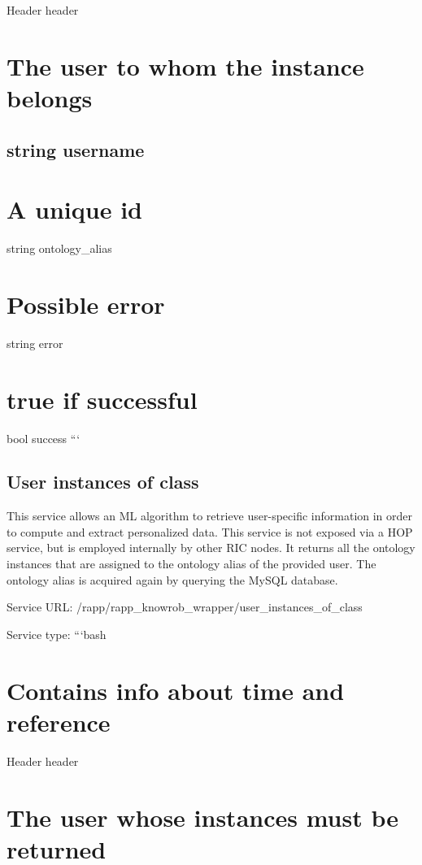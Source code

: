 Header header \section*{The user to whom the instance belongs}

\subsection*{string username }

\section*{A unique id}

string ontology\-\_\-alias \section*{Possible error}

string error \section*{true if successful}

bool success ```

\subsection*{User instances of class}

This service allows an M\-L algorithm to retrieve user-\/specific information in order to compute and extract personalized data. This service is not exposed via a H\-O\-P service, but is employed internally by other R\-I\-C nodes. It returns all the ontology instances that are assigned to the ontology alias of the provided user. The ontology alias is acquired again by querying the My\-S\-Q\-L database.

Service U\-R\-L\-: {\ttfamily /rapp/rapp\-\_\-knowrob\-\_\-wrapper/user\-\_\-instances\-\_\-of\-\_\-class}

Service type\-: ```bash \section*{Contains info about time and reference}

Header header \section*{The user whose instances must be returned}

